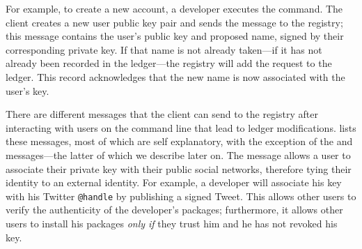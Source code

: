 For example, to create a new account, a developer executes the \spamuser{}
command. The \spam{} client creates a new user public key pair and sends the
\registeruser{} message to the registry; this message contains the user's
public key and proposed name, signed by their corresponding private key. If
that name is not already taken---if it has not already been recorded in the
ledger---the registry will add the \registeruser request to the ledger. This
record acknowledges that the new name is now associated with the user's key.

There are \numMessages different messages that the \spam client can send to the
registry after interacting with users on the command line that lead to ledger
modifications.  lists these messages, most of which are self
explanatory, with the exception of the \proveidentity{} and \extensible{}
messages---the latter of which we describe later on. The \proveidentity{}
message allows a user to associate their private key with their public social
networks, therefore tying their \spam identity to an external identity. For
example, a developer will associate his \spam{} key with his Twitter
\texttt{@handle} by publishing a signed Tweet. This allows other users to
verify the authenticity of the developer's packages; furthermore, it allows
other users to install his packages \emph{only if} they trust him and he has
not revoked his key. 


